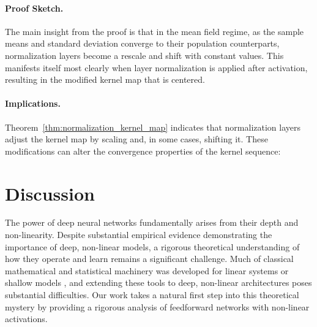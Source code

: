 \documentclass[twoside]{article}
\theoremstyle{definition}
\begin{document}
\paragraph{Proof Sketch.} The main insight from the proof is that in the mean field regime, as the sample means and standard deviation converge to their population counterparts, normalization layers become a rescale and shift with constant values. This manifests itself most clearly when layer normalization is applied after activation, resulting in the modified kernel map that is centered.

\paragraph{Implications.} Theorem~\ref{thm:normalization_kernel_map} indicates that normalization layers adjust the kernel map by scaling and, in some cases, shifting it. These modifications can alter the convergence properties of the kernel sequence:





\section{Discussion}



The power of deep neural networks fundamentally arises from their depth and non-linearity. Despite substantial empirical evidence demonstrating the importance of deep, non-linear models, a rigorous theoretical understanding of how they operate and learn remains a significant challenge. Much of classical mathematical and statistical machinery was developed for linear systems or shallow models \citep{hastie2009elements}, and extending these tools to deep, non-linear architectures poses substantial difficulties. Our work takes a natural first step into this theoretical mystery by providing a rigorous analysis of feedforward networks with non-linear activations. 
\end{document}
